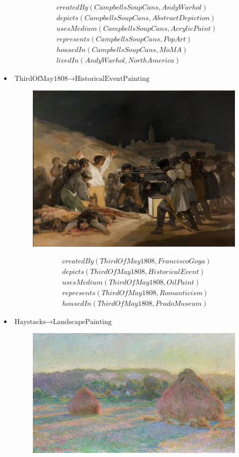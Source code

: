 \documentclass[a4paper, 11pt]{article}
\begin{document}
\begin{itemize}
\begin{align*}
      &createdBy(CampbellsSoupCans, AndyWarhol)\\
      &depicts(CampbellsSoupCans, AbstractDepiction)\\
      &usesMedium(CampbellsSoupCans, AcrylicPaint)\\
      &represents(CampbellsSoupCans, PopArt)\\
      &housedIn(CampbellsSoupCans, MoMA)\\
      &livedIn(AndyWarhol, NorthAmerica)
    \end{align*}
  \item $\text{ThirdOfMay1808} \to \text{HistoricalEventPainting}$
    \begin{figure}[H]
      \centering
      \includegraphics[width=\linewidth]{images/thirdofmay.jpg}
    \end{figure}
    \begin{align*}
      &createdBy(ThirdOfMay1808, FranciscoGoya)\\
      &depicts(ThirdOfMay1808, HistoricalEvent)\\
      &usesMedium(ThirdOfMay1808, OilPaint)\\
      &represents(ThirdOfMay1808, Romanticism)\\
      &housedIn(ThirdOfMay1808, PradoMuseum)
    \end{align*}
  \item $\text{Haystacks} \to \text{LandscapePainting}$
    \begin{figure}[H]
      \centering
      \includegraphics[width=\linewidth]{images/haystacks.jpg}

\end{figure}
\end{itemize}
\end{document}
